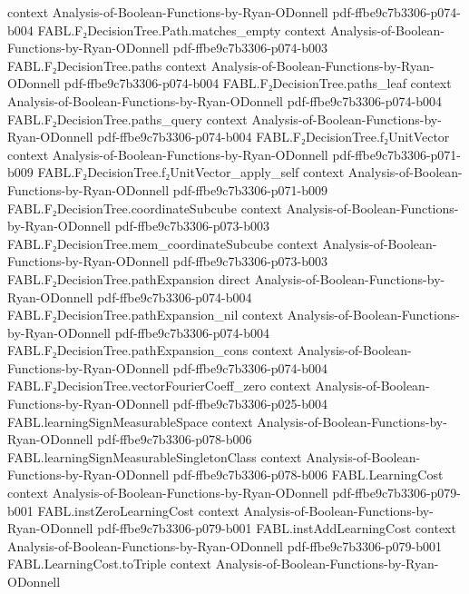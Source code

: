\begin{theorem}
  {context}
  {Analysis-of-Boolean-Functions-by-Ryan-ODonnell}
  {pdf-ffbe9c7b3306-p074-b004}
\proofstep
  {FABL.F₂DecisionTree.Path.matches_empty}
  {context}
  {Analysis-of-Boolean-Functions-by-Ryan-ODonnell}
  {pdf-ffbe9c7b3306-p074-b003}
\proofstep
  {FABL.F₂DecisionTree.paths}
  {context}
  {Analysis-of-Boolean-Functions-by-Ryan-ODonnell}
  {pdf-ffbe9c7b3306-p074-b004}
\proofstep
  {FABL.F₂DecisionTree.paths_leaf}
  {context}
  {Analysis-of-Boolean-Functions-by-Ryan-ODonnell}
  {pdf-ffbe9c7b3306-p074-b004}
\proofstep
  {FABL.F₂DecisionTree.paths_query}
  {context}
  {Analysis-of-Boolean-Functions-by-Ryan-ODonnell}
  {pdf-ffbe9c7b3306-p074-b004}
\proofstep
  {FABL.F₂DecisionTree.f₂UnitVector}
  {context}
  {Analysis-of-Boolean-Functions-by-Ryan-ODonnell}
  {pdf-ffbe9c7b3306-p071-b009}
\proofstep
  {FABL.F₂DecisionTree.f₂UnitVector_apply_self}
  {context}
  {Analysis-of-Boolean-Functions-by-Ryan-ODonnell}
  {pdf-ffbe9c7b3306-p071-b009}
\proofstep
  {FABL.F₂DecisionTree.coordinateSubcube}
  {context}
  {Analysis-of-Boolean-Functions-by-Ryan-ODonnell}
  {pdf-ffbe9c7b3306-p073-b003}
\proofstep
  {FABL.F₂DecisionTree.mem_coordinateSubcube}
  {context}
  {Analysis-of-Boolean-Functions-by-Ryan-ODonnell}
  {pdf-ffbe9c7b3306-p073-b003}
\proofstep
  {FABL.F₂DecisionTree.pathExpansion}
  {direct}
  {Analysis-of-Boolean-Functions-by-Ryan-ODonnell}
  {pdf-ffbe9c7b3306-p074-b004}
\proofstep
  {FABL.F₂DecisionTree.pathExpansion_nil}
  {context}
  {Analysis-of-Boolean-Functions-by-Ryan-ODonnell}
  {pdf-ffbe9c7b3306-p074-b004}
\proofstep
  {FABL.F₂DecisionTree.pathExpansion_cons}
  {context}
  {Analysis-of-Boolean-Functions-by-Ryan-ODonnell}
  {pdf-ffbe9c7b3306-p074-b004}
\proofstep
  {FABL.F₂DecisionTree.vectorFourierCoeff_zero}
  {context}
  {Analysis-of-Boolean-Functions-by-Ryan-ODonnell}
  {pdf-ffbe9c7b3306-p025-b004}
\proofstep
  {FABL.learningSignMeasurableSpace}
  {context}
  {Analysis-of-Boolean-Functions-by-Ryan-ODonnell}
  {pdf-ffbe9c7b3306-p078-b006}
\proofstep
  {FABL.learningSignMeasurableSingletonClass}
  {context}
  {Analysis-of-Boolean-Functions-by-Ryan-ODonnell}
  {pdf-ffbe9c7b3306-p078-b006}
\proofstep
  {FABL.LearningCost}
  {context}
  {Analysis-of-Boolean-Functions-by-Ryan-ODonnell}
  {pdf-ffbe9c7b3306-p079-b001}
\proofstep
  {FABL.instZeroLearningCost}
  {context}
  {Analysis-of-Boolean-Functions-by-Ryan-ODonnell}
  {pdf-ffbe9c7b3306-p079-b001}
\proofstep
  {FABL.instAddLearningCost}
  {context}
  {Analysis-of-Boolean-Functions-by-Ryan-ODonnell}
  {pdf-ffbe9c7b3306-p079-b001}
\proofstep
  {FABL.LearningCost.toTriple}
  {context}
  {Analysis-of-Boolean-Functions-by-Ryan-ODonnell}

\end{theorem}

